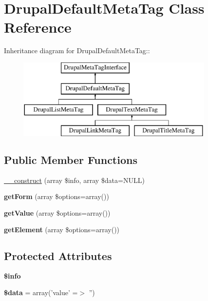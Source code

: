 \hypertarget{classDrupalDefaultMetaTag}{
\section{DrupalDefaultMetaTag Class Reference}
\label{classDrupalDefaultMetaTag}
}
Inheritance diagram for DrupalDefaultMetaTag::\begin{figure}[H]
\begin{center}
\leavevmode
\includegraphics[height=4cm]{classDrupalDefaultMetaTag}
\end{center}
\end{figure}
\subsection*{Public Member Functions}
\begin{DoxyCompactItemize}
\item 
\hyperlink{classDrupalDefaultMetaTag_a3d6469bf551465d3925212cfad789597}{\_\-\_\-construct} (array \$info, array \$data=NULL)
\item 
\hypertarget{classDrupalDefaultMetaTag_a1cb4ab2c8c20d61072a717538d349f40}{
{\bfseries getForm} (array \$options=array())}
\label{classDrupalDefaultMetaTag_a1cb4ab2c8c20d61072a717538d349f40}

\item 
\hypertarget{classDrupalDefaultMetaTag_a6b8811517a0478d9ebf14c2dd5499e05}{
{\bfseries getValue} (array \$options=array())}
\label{classDrupalDefaultMetaTag_a6b8811517a0478d9ebf14c2dd5499e05}

\item 
\hypertarget{classDrupalDefaultMetaTag_afb12293adf445dc1d1d9412c3852dee9}{
{\bfseries getElement} (array \$options=array())}
\label{classDrupalDefaultMetaTag_afb12293adf445dc1d1d9412c3852dee9}

\end{DoxyCompactItemize}
\subsection*{Protected Attributes}
\begin{DoxyCompactItemize}
\item 
\hypertarget{classDrupalDefaultMetaTag_a6d1cff98468c1229acc61cd029551a56}{
{\bfseries \$info}}
\label{classDrupalDefaultMetaTag_a6d1cff98468c1229acc61cd029551a56}

\item 
\hypertarget{classDrupalDefaultMetaTag_ac3bc7bf4da4dfdef97bac9eb40cc24d3}{
{\bfseries \$data} = array('value' =$>$ '')}
\label{classDrupalDefaultMetaTag_ac3bc7bf4da4dfdef97bac9eb40cc24d3}

\end{DoxyCompactItemize}


